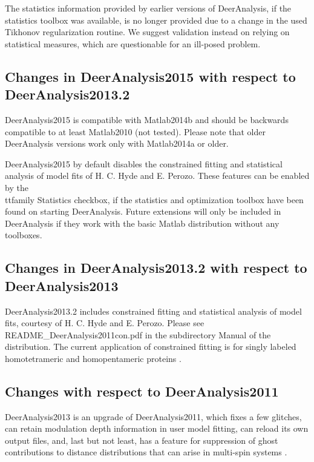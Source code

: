 \documentclass{article}
\begin{document}
The statistics information provided by earlier versions of DeerAnalysis, if the statistics toolbox was available, is no longer provided due to a change in the used Tikhonov regularization routine. We suggest validation instead on relying on statistical measures, which are questionable for an ill-posed problem. 

\subsection{Changes in DeerAnalysis2015 with respect to DeerAnalysis2013.2}
\label{changes_2015}

DeerAnalysis2015 is compatible with Matlab2014b and should be backwards compatible to at least Matlab2010 (not tested). Please note that older DeerAnalysis versions work only with Matlab2014a or older. 

DeerAnalysis2015 by default disables the constrained fitting and statistical analysis of model fits of H. C. Hyde and E. Perozo. These features can be enabled by the {\\ttfamily Statistics} checkbox, if the statistics and optimization toolbox have been found on starting DeerAnalysis. Future extensions will only be included in DeerAnalysis if they work with the basic Matlab distribution without any toolboxes.

\subsection{Changes in DeerAnalysis2013.2 with respect to DeerAnalysis2013}
\label{changes_2013b}

DeerAnalysis2013.2 includes constrained fitting and statistical analysis of model fits, courtesy of H. C. Hyde and E. Perozo. Please see {\ttfamily README\_DeerAnalysis2011con.pdf} in the subdirectory {\ttfamily Manual} of the distribution. The current application of constrained fitting is for singly labeled homotetrameric and homopentameric proteins \cite{dalmas2012}.

\subsection{Changes with respect to DeerAnalysis2011}
\label{changes_2013}

DeerAnalysis2013 is an upgrade of DeerAnalysis2011, which fixes a few glitches, can retain modulation depth information in user model fitting, can reload its own output files, and, last but not least, has a feature for suppression of ghost contributions to distance distributions that can arise in multi-spin systems \cite{vonHagens2013}.    
\end{document}
